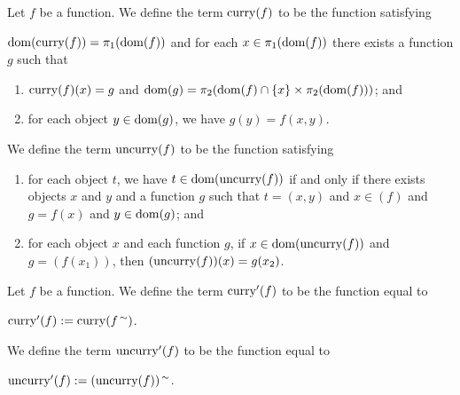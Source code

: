 \documentclass{article}
\begin{document}
\begin{definition}
Let $f$ be a function.
We define the term $\operatorname{curry}(f)$ to be the function satisfying
\begin{defn}
\item $\operatorname{dom}(\operatorname{curry}(f))=\pi_{1}(\operatorname{dom}(f))$ and for each $x\in\pi_{1}(\operatorname{dom}(f))$ there exists a function $g$ such
    that
  \begin{enumerate}[label=(\roman*)]
  \item $\operatorname{curry}(f)(x)=g$ and $\operatorname{dom}(g)=\pi_{2}(\operatorname{dom}(f)\cap\{x\}\times\pi_{2}(\operatorname{dom}(f)))$;
    and
  \item for each object $y\in\operatorname{dom}(g)$, we have $g(y)=f(x,y)$.
  \end{enumerate}
\end{defn}
We define the term $\operatorname{uncurry}(f)$ to be the function satisfying
\begin{defn}
\item 
  \begin{enumerate}[label=(\roman*)]
  \item for each object $t$, we have $t\in\operatorname{dom}(\operatorname{uncurry}(f))$ if and only
    if there exists objects $x$ and $y$ and a function $g$ such that
    $t=(x,y)$ and $x\in(f)$ and $g=f(x)$ and $y\in\operatorname{dom}(g)$; and
  \item for each object $x$ and each function $g$, if
    $x\in\operatorname{dom}(\operatorname{uncurry}(f))$ and $g=(f(x_{1}))$, then $(\operatorname{uncurry}(f))(x)=g(x_{2})$.
  \end{enumerate}
\end{defn}
\end{definition}

\begin{definition}
Let $f$ be a function.
We define the term $\operatorname{curry}'(f)$ to be the function equal to
\begin{defn}
\item $\operatorname{curry}'(f):=\operatorname{curry}(f^{\,\sim})$.
\end{defn}
We define the term $\operatorname{uncurry}'(f)$ to be the function equal to
\begin{defn}
\item $\operatorname{uncurry}'(f):=(\operatorname{uncurry}(f))^{\,\sim}$.
\end{defn}
\end{definition}
\end{document}
